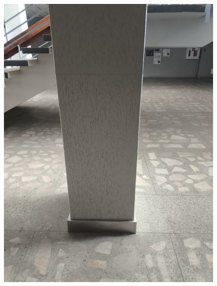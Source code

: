 \begin{figure}[H]
    \centering
    \begin{minipage}[b]{0.3\linewidth}
        \centering
        \includegraphics[width=\linewidth]{Src/images/photo_5906680020825392807_y.jpg}
        \label{fig:rotation-a}
    \end{minipage}
    \hfill
    \begin{minipage}[b]{0.3\linewidth}
        \centering

\end{minipage}
\end{figure}
